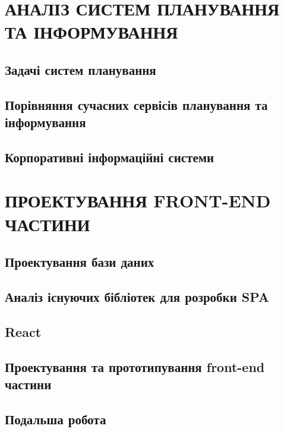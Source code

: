 \documentclass[a4paper,14pt]{extarticle} %
\begin{document}


\tableofcontents %
\clearpage


\section{АНАЛІЗ СИСТЕМ ПЛАНУВАННЯ ТА ІНФОРМУВАННЯ}
\subsection{Задачі систем планування} 

\subsection{Порівняння сучасних сервісів планування та інформування} 




\subsection{Корпоративні інформаційні системи} 



\section{ПРОЕКТУВАННЯ FRONT-END ЧАСТИНИ}
\subsection{Проектування бази даних}






\subsection{Аналіз існуючих бібліотек для розробки SPA}

\subsection{React}

\subsection{Проектування та прототипування front-end частини}



\subsection{Подальша робота}


\end{document}
